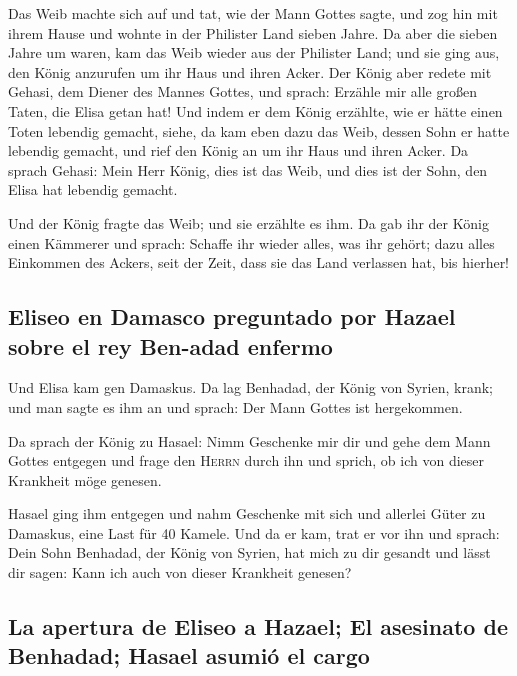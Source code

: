  Das Weib machte sich auf und tat, wie der Mann Gottes
sagte, und zog hin mit ihrem Hause und wohnte in der Philister Land
sieben Jahre.  Da aber die sieben Jahre um waren, kam das
Weib wieder aus der Philister Land; und sie ging aus, den König
anzurufen um ihr Haus und ihren Acker.  Der König aber
redete mit Gehasi, dem Diener des Mannes Gottes, und sprach: Erzähle mir
alle großen Taten, die Elisa getan hat!  Und indem er dem
König erzählte, wie er hätte einen Toten lebendig gemacht, siehe, da kam
eben dazu das Weib, dessen Sohn er hatte lebendig gemacht, und rief den
König an um ihr Haus und ihren Acker. Da sprach Gehasi: Mein Herr König,
dies ist das Weib, und dies ist der Sohn, den Elisa hat lebendig
gemacht.

 Und der König fragte das Weib; und sie erzählte es ihm.
Da gab ihr der König einen Kämmerer und sprach: Schaffe ihr wieder
alles, was ihr gehört; dazu alles Einkommen des Ackers, seit der Zeit,
dass sie das Land verlassen hat, bis hierher!

\hypertarget{eliseo-en-damasco-preguntado-por-hazael-sobre-el-rey-ben-adad-enfermo}{%
\subsection{Eliseo en Damasco preguntado por Hazael sobre el rey
Ben-adad
enfermo}\label{eliseo-en-damasco-preguntado-por-hazael-sobre-el-rey-ben-adad-enfermo}}

 Und Elisa kam gen Damaskus. Da lag Benhadad, der König
von Syrien, krank; und man sagte es ihm an und sprach: Der Mann Gottes
ist hergekommen.

 Da sprach der König zu Hasael: Nimm Geschenke mir dir und
gehe dem Mann Gottes entgegen und frage den \textsc{Herrn} durch ihn und
sprich, ob ich von dieser Krankheit möge genesen.

 Hasael ging ihm entgegen und nahm Geschenke mit sich und
allerlei Güter zu Damaskus, eine Last für 40 Kamele. Und da er kam, trat
er vor ihn und sprach: Dein Sohn Benhadad, der König von Syrien, hat
mich zu dir gesandt und lässt dir sagen: Kann ich auch von dieser
Krankheit genesen?

\hypertarget{la-apertura-de-eliseo-a-hazael-el-asesinato-de-benhadad-hasael-asumiuxf3-el-cargo}{%
\subsection{La apertura de Eliseo a Hazael; El asesinato de Benhadad;
Hasael asumió el
cargo}\label{la-apertura-de-eliseo-a-hazael-el-asesinato-de-benhadad-hasael-asumiuxf3-el-cargo}}


